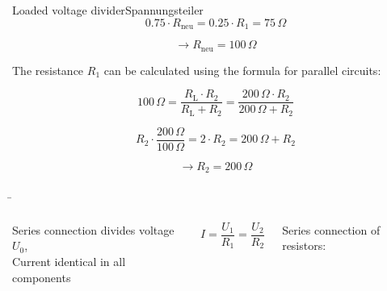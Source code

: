 \begin{frame}
{\begin{expl}{Loaded voltage divider}{Spannungsteiler}
			\begin{equation*}
				0.75 \cdot R_\mathrm{neu} = 0.25 \cdot R_1 = 75 \, \Omega
			\end{equation*}
			
			\begin{equation*}
				\rightarrow R_\mathrm{neu} = 100 \, \Omega
			\end{equation*}
			
			The resistance $R_1$ can be calculated using the formula for parallel circuits:
			
			\begin{equation*}
				100 \, \Omega = \frac{R_\mathrm{L} \cdot R_2}{R_\mathrm{L} + R_2} = \frac{200 \, \Omega \cdot R_2}{200 \, \Omega + R_2}
			\end{equation*}
			
			\begin{equation}
				R_2 \cdot \frac{200 \, \Omega}{100 \, \Omega} = 2 \cdot R_2 = 200 \, \Omega + R_2
			\end{equation}
			
			\begin{equation*}
				\rightarrow R_2 = 200 \, \Omega
			\end{equation*}
			
			
			
		\end{expl}
		
		
		
	}
	
	
	
	\b{
		
		\begin{columns}
			
			
			Series connection divides voltage $U_0$,\\
			Current identical in all components
			
			\begin{equation*}
				I = \frac{U_1}{R_1} = \frac{U_2}{R_2}
			\end{equation*}
			
			
			
			
			
			Series connection of resistors:
			

\end{columns}}
\end{frame}
